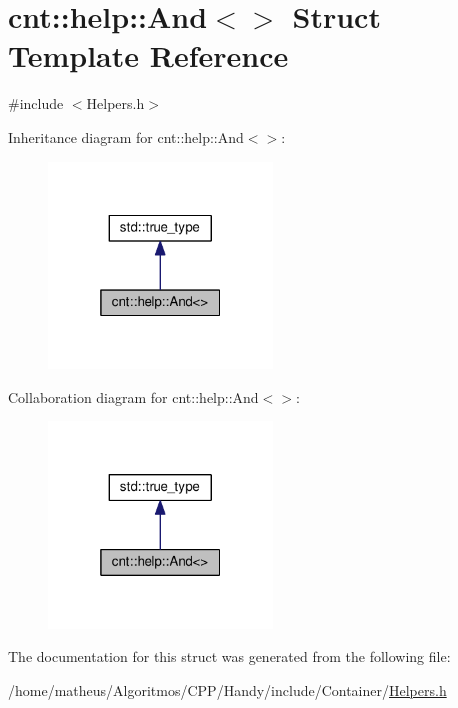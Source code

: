 \hypertarget{structcnt_1_1help_1_1And_3_4}{}\section{cnt\+:\+:help\+:\+:And$<$$>$ Struct Template Reference}
\label{structcnt_1_1help_1_1And_3_4}


{\ttfamily \#include $<$Helpers.\+h$>$}



Inheritance diagram for cnt\+:\+:help\+:\+:And$<$$>$\+:\nopagebreak
\begin{figure}[H]
\begin{center}
\leavevmode
\includegraphics[width=169pt]{structcnt_1_1help_1_1And_3_4__inherit__graph}
\end{center}
\end{figure}


Collaboration diagram for cnt\+:\+:help\+:\+:And$<$$>$\+:\nopagebreak
\begin{figure}[H]
\begin{center}
\leavevmode
\includegraphics[width=169pt]{structcnt_1_1help_1_1And_3_4__coll__graph}
\end{center}
\end{figure}


The documentation for this struct was generated from the following file\+:\begin{DoxyCompactItemize}
\item 
/home/matheus/\+Algoritmos/\+C\+P\+P/\+Handy/include/\+Container/\hyperlink{Container_2Helpers_8h}{Helpers.\+h}\end{DoxyCompactItemize}
